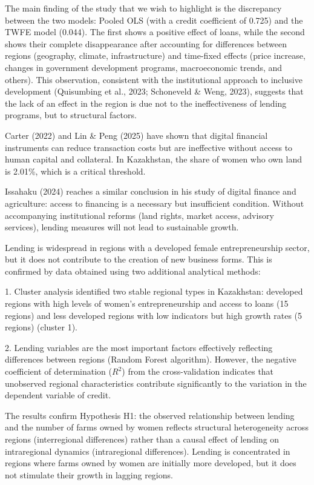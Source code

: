 ﻿\documentclass[sn-mathphys-num]{sn-jnl}
\newcommand{\hl}[1]{#1}
\begin{document}
The main finding of the study that we wish to highlight is the
discrepancy between the two models: Pooled OLS (with a credit
coefficient of 0.725) and the TWFE model (0.044). The first shows a
positive effect of loans, while the second shows their complete
disappearance after accounting for differences between regions
(geography, climate, infrastructure) and time-fixed effects (price
increase, changes in government development programs, macroeconomic
trends, and others). This observation, consistent with the institutional
approach to inclusive development (\hl{Quisumbing et al., 2023;
Schoneveld \& Weng, 2023}), suggests that the lack of an effect in the
region is due not to the ineffectiveness of lending programs, but to
structural factors.

\hl{Carter (2022)} and \hl{Lin \& Peng (2025)} have shown that digital
financial instruments can reduce transaction costs but are ineffective
without access to human capital and collateral. In Kazakhstan, the share
of women who own land is 2.01\%, which is a critical threshold.

\hl{Issahaku (2024}) reaches a similar conclusion in his study of
digital finance and agriculture: access to financing is a necessary but
insufficient condition. Without accompanying institutional reforms (land
rights, market access, advisory services), lending measures will not
lead to sustainable growth.

Lending is widespread in regions with a developed female
entrepreneurship sector, but it does not contribute to the creation of
new business forms. This is confirmed by data obtained using two
additional analytical methods:

1. Cluster analysis identified two stable regional types in Kazakhstan:
developed regions with high levels of women's entrepreneurship and
access to loans (15 regions) and less developed regions with low
indicators but high growth rates (5 regions) (cluster 1).

2. Lending variables are the most important factors effectively
reflecting differences between regions (Random Forest algorithm).
However, the negative coefficient of determination ($R^2$) from the
cross-validation indicates that unobserved regional characteristics
contribute significantly to the variation in the dependent variable of
credit.

The results confirm Hypothesis H1: the observed relationship between
lending and the number of farms owned by women reflects structural
heterogeneity across regions (interregional differences) rather than a
causal effect of lending on intraregional dynamics (intraregional
differences). Lending is concentrated in regions where farms owned by
women are initially more developed, but it does not stimulate their
growth in lagging regions.
\end{document}
